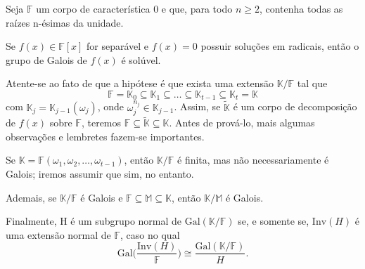 \documentclass[../algebraIII_notes.tex]{subfiles}
\begin{document}
\begin{theorem*}
	Seja \(\mathbb{F}\) um corpo de característica 0 e que, para todo \(n\geq 2\), contenha todas as raízes n-ésimas da unidade.

	Se \(f(x)\in \mathbb{F}[x]\) for separável e \(f(x) = 0\) possuir soluções em radicais, então o grupo de Galois de \(f(x)\) é solúvel.
\end{theorem*}
Atente-se ao fato de que a hipótese é que exista uma extensão \(\mathbb{K}/\mathbb{F}\) tal que
\[
	\mathbb{F} = \mathbb{K}_{0}\subseteq \mathbb{K}_1 \subseteq \dotsc \subseteq \mathbb{K}_{t-1}\subseteq \mathbb{K}_{t} = \mathbb{K}
\]
com \(\mathbb{K}_{j}=\mathbb{K}_{j-1}(\omega_{j})\), onde \(\omega_{j}^{n_{j}}\in \mathbb{K}_{j-1}\). Assim, se \(\tilde{\mathbb{K}}\) é um corpo de
decomposição de \(f(x)\) sobre \(\mathbb{F}\), teremos \(\mathbb{F}\subseteq \tilde{\mathbb{K}}\subseteq \mathbb{K}\).
Antes de prová-lo, mais algumas observações e lembretes fazem-se importantes.
\begin{tcolorbox}[
		skin=enhanced,
		title=Observação,
		fonttitle=\bfseries,
		colframe=black,
		colbacktitle=cyan!75!white,
		colback=cyan!15,
		colbacklower=black,
		coltitle=black,
		drop fuzzy shadow,
	]
	Se \(\mathbb{K} = \mathbb{F}(\omega_1, \omega_2, \dotsc , \omega_{t-1})\), então \(\mathbb{K}/\mathbb{F}\) é finita, mas não necessariamente é Galois; iremos assumir que sim, no entanto.

	Ademais, se \(\mathbb{K}/\mathbb{F}\) é Galois e \(\mathbb{F}\subseteq \mathbb{M}\subseteq \mathbb{K}\), então \(\mathbb{K}/\mathbb{M}\) é Galois.

	Finalmente, H é um subgrupo normal de \(\mathrm{Gal}(\mathbb{K}/\mathbb{F})\) se, e somente se, \(\mathrm{Inv}(H)\) é uma extensão normal de \(\mathbb{F}\), caso no qual
	\[
		\mathrm{Gal}\biggl(\frac{\mathrm{Inv}(H)}{\mathbb{F}}\biggr)\cong \frac{\mathrm{Gal}(\mathbb{K}/\mathbb{F})}{H}.
	\]
\end{tcolorbox}
\end{document}
